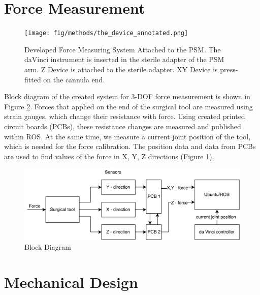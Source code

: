 \section{Force Measurement}
\label{sec:sysArch}

\begin{figure}[h]
	\begin{center}
	\texttt{[image: fig/methods/the\_device\_annotated.png]}
	\end{center}
	\vspace{-4mm}
	\caption[Developed Force Measuring System Attached to the PSM]
	{Developed Force Measuring System Attached to the PSM. The daVinci instrument is inserted in the sterile adapter of the PSM arm. Z Device is attached to the sterile adapter. XY Device is press-fitted on the cannula end.}
	\label{fig:PSM_with_FF}
	\vspace{-2mm}
\end{figure}

Block diagram of the created system for 3-DOF force measurement is shown in Figure \ref{fig:BlockDiag}. Forces that applied on the end of the surgical tool are measured using strain gauges, which change their resistance with force. Using created printed circuit boards (PCBs), these resistance changes are measured and published within ROS. At the same time, we measure a current joint position of the tool, which is needed for the force calibration. The position data and data from PCBs are used to find values of the force in X, Y, Z directions (Figure \ref{fig:PSM_with_FF}).

\begin{figure}[h]
	\begin{center}
		\includegraphics[width=140mm]{fig/methods/dbd2.pdf}
	\end{center}
	\vspace{-4mm}
	\caption[Block Diagram]
	{Block Diagram}
	\label{fig:BlockDiag}
	\vspace{-2mm}
\end{figure}


\section{Mechanical Design}
\label{sec:mechDes}


